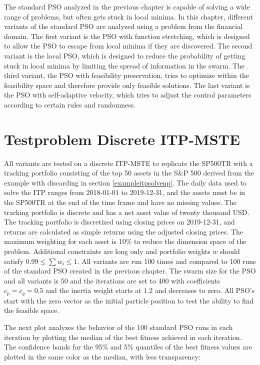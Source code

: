 \documentclass[
  oneside, a4paper, 12pt, openany]{book}
\theoremstyle{definition}
\theoremstyle{definition}
\theoremstyle{definition}
\theoremstyle{definition}
\theoremstyle{remark}
\begin{document}
The standard PSO analyzed in the previous chapter is capable of solving a wide range of problems, but often gets stuck in local minima. In this chapter, different variants of the standard PSO are analyzed using a problem from the financial domain. The first variant is the PSO with function stretching, which is designed to allow the PSO to escape from local minima if they are discovered. The second variant is the local PSO, which is designed to reduce the probability of getting stuck in local minima by limiting the spread of information in the swarm. The third variant, the PSO with feasibility preservation, tries to optimize within the feasibility space and therefore provide only feasible solutions. The last variant is the PSO with self-adaptive velocity, which tries to adjust the control parameters according to certain rules and randomness.

\hypertarget{testproblem-discrete-itp-mste}{%
\section{Testproblem Discrete ITP-MSTE}\label{testproblem-discrete-itp-mste}}

All variants are tested on a discrete ITP-MSTE to replicate the SP500TR with a tracking portfolio consisting of the top 50 assets in the S\&P 500 derived from the example with discarding in section \ref{exampleitpsolveqp}. The daily data used to solve the ITP ranges from 2018-01-01 to 2019-12-31, and the assets must be in the SP500TR at the end of the time frame and have no missing values. The tracking portfolio is discrete and has a net asset value of twenty thousand USD. The tracking portfolio is discretized using closing prices on 2019-12-31, and returns are calculated as simple returns using the adjusted closing prices. The maximum weighting for each asset is 10\% to reduce the dimension space of the problem. Additional constraints are long only and portfolio weights \(w\) should satisfy \(0.99 \leq \textstyle\sum w_i \leq 1\). All variants are run 100 times and compared to 100 runs of the standard PSO created in the previous chapter. The swarm size for the PSO and all variants is 50 and the iterations are set to 400 with coefficients \(c_p=c_g=0.5\) and the inertia weight starts at \(1.2\) and decreases to zero. All PSO's start with the zero vector as the initial particle position to test the ability to find the feasible space.

The next plot analyzes the behavior of the 100 standard PSO runs in each iteration by plotting the median of the best fitness achieved in each iteration. The confidence bands for the 95\% and 5\% quantiles of the best fitness values are plotted in the same color as the median, with less transparency:
\end{document}
